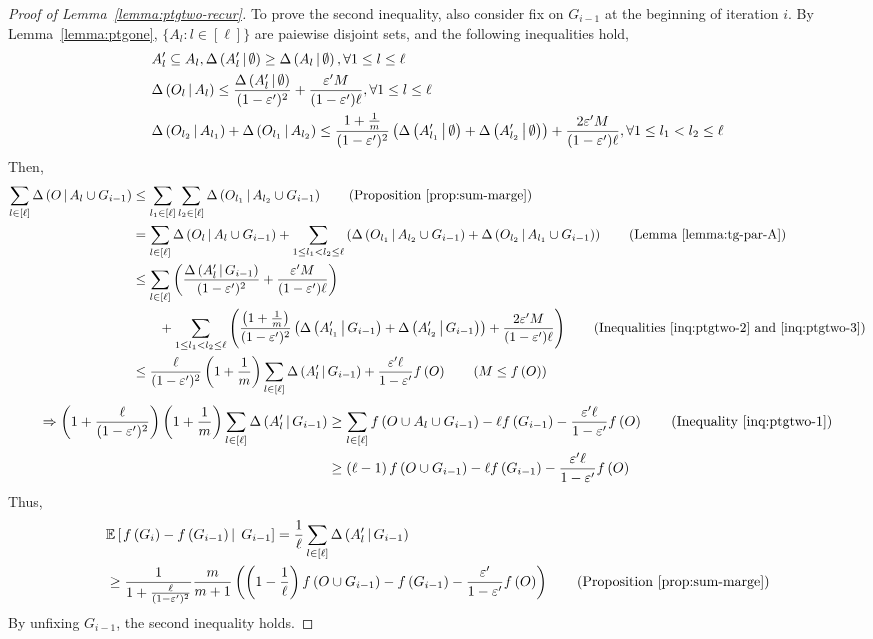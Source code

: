 \begin{proof}[Proof of Lemma~\ref{lemma:ptgtwo-recur}]
To prove the second inequality, also consider fix on $G_{i-1}$ at the beginning of iteration $i$.
By Lemma~\ref{lemma:ptgone},
$\{A_l: l\in [\ell]\}$ are paiewise disjoint sets,
and the following inequalities hold,
\begin{align}
&A_l'\subseteq A_l, \Delta \left( A_l' \, \middle| \, \emptyset \right) \ge \Delta \left( A_l \, \middle| \, \emptyset \right), \forall 1\le l \le \ell \label{inq:ptgtwo-1}\\
&\Delta \left( O_{l} \, \middle| \, A_{l} \right)\le \frac{\Delta \left( A_{l}' \, \middle| \, \emptyset \right)}{(1-\varepsilon')^2}+\frac{\varepsilon' M}{(1-\varepsilon')\ell}, \forall 1\le l \le \ell \label{inq:ptgtwo-2}\\
&\Delta \left( O_{l_2} \, \middle| \, A_{l_1} \right) + \Delta \left( O_{l_1} \, \middle| \, A_{l_2} \right) \le \frac{1+\frac{1}{m}}{(1-\varepsilon')^2}\left(\Delta \left( A_{l_1}' \, \middle| \, \emptyset \right)+\Delta \left( A_{l_2}' \, \middle| \, \emptyset \right)\right) + \frac{2\varepsilon' M}{(1-\varepsilon')\ell}, \forall 1\le l_1 < l_2 \le \ell \label{inq:ptgtwo-3}
\end{align}
Then,
\begin{align*}
\sum_{l\in [\ell]}\marge{O}{A_l\cup G_{i-1}} &\le \sum_{l_1\in [\ell]}\sum_{l_2\in [\ell]}\marge{O_{l_1}}{A_{l_2}\cup G_{i-1}}\tag{Proposition~\ref{prop:sum-marge}}\\
& = \sum_{l \in [\ell]}\marge{O_{l}}{A_{l}\cup G_{i-1}} + \sum_{1\le l_1< l_2 \le \ell} \left(\marge{O_{l_1}}{A_{l_2}\cup G_{i-1}} +\marge{O_{l_2}}{A_{l_1}\cup G_{i-1}}\right) \tag{Lemma~\ref{lemma:tg-par-A}}\\
& \le \sum_{l \in [\ell]}\left(\frac{\marge{A_{l}'}{G_{i-1}}}{(1-\epsi')^2}+\frac{\epsi' M}{(1-\epsi')\ell}\right)\\
&\hspace*{2em}+\sum_{1\le l_1< l_2 \le \ell} \left(\frac{\left(1+\frac{1}{m}\right)}{(1-\epsi')^2}\left(\marge{A_{l_1}'}{G_{i-1}}
+\marge{A_{l_2}'}{G_{i-1}}\right)
+\frac{2\epsi' M}{(1-\epsi')\ell}\right)\tag{Inequalities~\eqref{inq:ptgtwo-2} and~\eqref{inq:ptgtwo-3}}\\
&\le \frac{\ell}{(1-\epsi')^2}\left(1+\frac{1}{m}\right)\sum_{l \in [\ell]}\marge{A_{l}'}{G_{i-1}} + \frac{\epsi' \ell}{1-\epsi'}\ff{O}\tag{$M \le \ff{O}$}
\end{align*}
\begin{align*}
\Rightarrow \left(1+\frac{\ell}{(1-\epsi')^2}\right)\left(1+\frac{1}{m}\right) \sum_{l\in [\ell]}\marge{A_l'}{G_{i-1}} &\ge \sum_{l\in [\ell]}\ff{O\cup A_l\cup G_{i-1}} -\ell\ff{G_{i-1}} - \frac{\epsi' \ell}{1-\epsi'}\ff{O} \tag{Inequality~\eqref{inq:ptgtwo-1}}\\
&\ge \left(\ell-1\right)\ff{O\cup G_{i-1}}-\ell\ff{G_{i-1}} - \frac{\epsi' \ell}{1-\epsi'}\ff{O}
\end{align*}
Thus,
\begin{align*}
&\exc{\ff{G_i} - \ff{G_{i-1}}}{G_{i-1}}  = \frac{1}{\ell}\sum_{l \in [\ell]}\marge{A_{l}'}{G_{i-1}}\\
&\ge \frac{1}{1+\frac{\ell}{(1-\epsi')^2}} \frac{m}{m+1}\left(\left(1-\frac{1}{\ell}\right)  \ff{O\cup G_{i-1}} - \ff{G_{i-1}} - \frac{\epsi'}{1-\epsi'}\ff{O}\right)\tag{Proposition~\ref{prop:sum-marge}}
\end{align*}
By unfixing $G_{i-1}$, the second inequality holds.
\end{proof}
